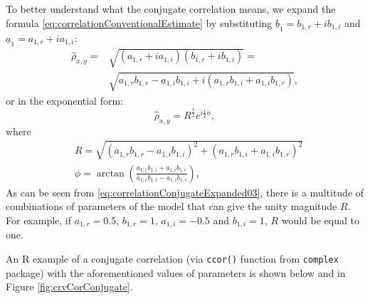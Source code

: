 \documentclass[
]{book}
\begin{document}
To better understand what the conjugate correlation means, we expand the formula \eqref{eq:correlationConventionalEstimate} by substituting \(\underline{b}_1 = b_{1,r} + i b_{1,i}\) and \(\underline{a}_1 = a_{1,r} + i a_{1,i}\):
\begin{equation}
    \begin{aligned}
        \hat{\rho}_{x,y} = & \sqrt{(a_{1,r} + i a_{1,i}) (b_{1,r}+ib_{1,i})} = \\
        & \sqrt{a_{1,r} b_{1,r} - a_{1,i} b_{1,i} + i(a_{1,r} b_{1,i} + a_{1,i} b_{1,r})},
    \end{aligned}
    \label{eq:correlationConjugateExpanded01}
\end{equation}
or in the exponential form:
\begin{equation}
    \hat{\rho}_{x,y} = R^{\frac{1}{2}} e^{i \frac{1}{2} \phi} ,
    \label{eq:correlationConjugateExpanded02}
\end{equation}
where
\begin{equation}
    \begin{aligned}
        & R = \sqrt{\left(a_{1,r} b_{1,r} - a_{1,i} b_{1,i}\right)^2 + \left(a_{1,r} b_{1,i} + a_{1,i} b_{1,r}\right)^2} \\
        & \phi=\arctan\left(\frac{a_{1,r} b_{1,i} + a_{1,i} b_{1,r}}{a_{1,r} b_{1,r} - a_{1,i} b_{1,i}}\right),
    \end{aligned}
    \label{eq:correlationConjugateExpanded03}
\end{equation}
As can be seen from \eqref{eq:correlationConjugateExpanded03}, there is a multitude of combinations of parameters of the model that can give the unity magnitude \(R\). For example, if \(a_{1,r} = 0.5\), \(b_{1,r} = 1\), \(a_{1,i} = -0.5\) and \(b_{1,i} = 1\), \(R\) would be equal to one.

An R example of a conjugate correlation (via \texttt{ccor()} function from \texttt{complex} package) with the aforementioned values of parameters is shown below and in Figure \ref{fig:crvCorConjugate}.
\end{document}
